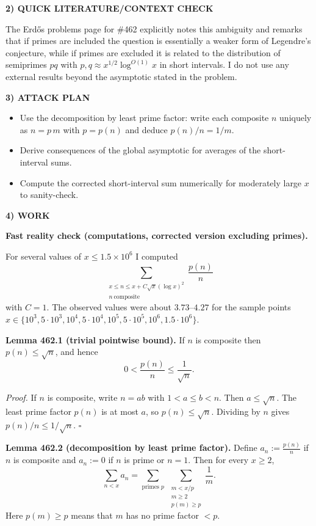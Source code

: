 \noindent\textbf{2) QUICK LITERATURE/CONTEXT CHECK}

The Erd\H{o}s problems page for \#462 explicitly notes this ambiguity and remarks that if primes are included the question is essentially a weaker form of Legendre's conjecture, while if primes are excluded it is related to the distribution of semiprimes $pq$ with $p,q\approx x^{1/2}\log^{O(1)}x$ in short intervals. I do not use any external results beyond the asymptotic stated in the problem.

\noindent\textbf{3) ATTACK PLAN}

\begin{itemize}
\item Use the decomposition by least prime factor: write each composite $n$ uniquely as $n=p\,m$ with $p=p(n)$ and deduce $p(n)/n=1/m$.
\item Derive consequences of the global asymptotic for averages of the short-interval sums.
\item Compute the corrected short-interval sum numerically for moderately large $x$ to sanity-check.
\end{itemize}

\noindent\textbf{4) WORK}

\textbf{Fast reality check (computations, corrected version excluding primes).}

For several values of $x\le 1.5\times 10^6$ I computed
\[\sum_{\substack{x\le n\le x+ C\sqrt{x}(\log x)^2\\ n\ \mathrm{composite}}}\frac{p(n)}{n}
\]
with $C=1$.  The observed values were about $3.73$--$4.27$ for the sample points $x\in\{10^3,5\cdot 10^3,10^4,5\cdot 10^4,10^5,5\cdot 10^5,10^6,1.5\cdot 10^6\}$.

\medskip
\noindent\textbf{Lemma 462.1 (trivial pointwise bound).}
If $n$ is composite then $p(n)\le \sqrt{n}$, and hence
\[0<\frac{p(n)}{n}\le \frac1{\sqrt{n}}.
\]

\textit{Proof.}
If $n$ is composite, write $n=ab$ with $1<a\le b<n$. Then $a\le\sqrt{n}$.
The least prime factor $p(n)$ is at most $a$, so $p(n)\le\sqrt{n}$. Dividing by $n$ gives $p(n)/n\le 1/\sqrt{n}$. \hfill$\square$

\medskip
\noindent\textbf{Lemma 462.2 (decomposition by least prime factor).}
Define $a_n:=\frac{p(n)}{n}$ if $n$ is composite and $a_n:=0$ if $n$ is prime or $n=1$.
Then for every $x\ge 2$,
\[\sum_{n<x} a_n = \sum_{\text{primes }p}\ \sum_{\substack{m<x/p\\ m\ge 2\\ p(m)\ge p}} \frac1m.
\]
Here $p(m)\ge p$ means that $m$ has no prime factor $<p$.


